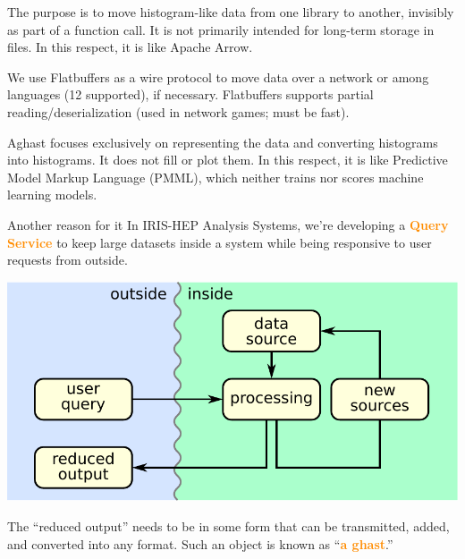 \documentclass[aspectratio=169]{beamer}
\begin{document}
\begin{frame}{}
\vspace{1.25 cm}
\begin{description}\setlength{\itemsep}{0.5 cm}
\item[in-memory:] The purpose is to move histogram-like data from one library to another, invisibly as part of a function call. It is not primarily intended for long-term storage in files. In this respect, it is like Apache Arrow.

\item[serializable:]<2-> We use Flatbuffers as a wire protocol to move data over a network or among languages (12 supported), if necessary. Flatbuffers supports partial reading/deserialization (used in network games; must be fast).

\item[ontology:]<3-> Aghast focuses exclusively on representing the data and converting histograms into histograms. It does not fill or plot them. In this respect, it is like Predictive Model Markup Language (PMML), which neither trains nor scores machine learning models.
\end{description}
\end{frame}

\begin{frame}{Another reason for it}
\vspace{0.5 cm}
\large
In IRIS-HEP Analysis Systems, we're developing a \textcolor{darkorange}{\bf Query Service} to keep large datasets inside a system while being responsive to user requests from outside.

\begin{center}
\includegraphics[width=0.6\linewidth]{basic-block-diagram.pdf}
\end{center}

The ``reduced output'' needs to be in some form that can be transmitted, added, and converted into any format. Such an object is known as ``\textcolor{darkorange}{\bf a ghast}.''
\end{frame}
\end{document}

